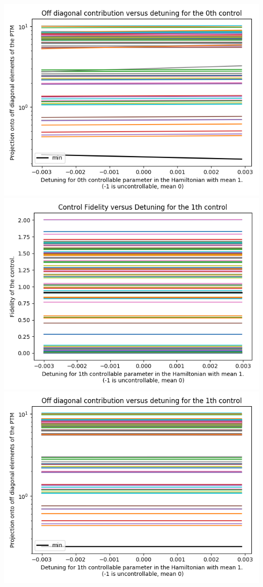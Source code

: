 \documentclass{article}
\begin{document}
\begin{center}
\includegraphics[scale=.9]{off_diag_1}
\includegraphics[scale=.9]{control_fid_2}
\includegraphics[scale=.9]{off_diag_2}

\end{center}
\end{document}
